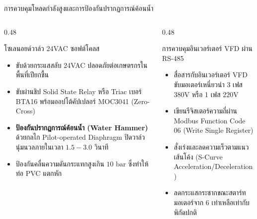 \documentclass[aspectratio=169, 10pt]{beamer}
\begin{document}
\begin{frame}{การควบคุมโหลดกำลังสูงและการป้องกันปรากฏการณ์ค้อนน้ำ}
\begin{columns}[T]
    \begin{column}{0.48\textwidth}
        \begin{mastercard}{โซเลนอยด์วาล์ว 24VAC ซอฟต์โคลส}
            \begin{itemize}
                \item ขับด้วยกระแสสลับ 24VAC ปลอดภัยต่อเกษตรกรในพื้นที่เปียกชื้น
                \item ขับผ่านชิป Solid State Relay หรือ Triac เบอร์ BTA16 พร้อมออปโต้คัปเปลอร์ MOC3041 (Zero-Cross)
                \item \textbf{ป้องกันปรากฏการณ์ค้อนน้ำ (Water Hammer)} ด้วยกลไก Pilot-operated Diaphragm ปิดวาล์วนุ่มนวลภายในเวลา $1.5 - 3.0$ วินาที
                \item ป้องกันคลื่นความดันกระแทกสูงเกิน $10\text{ bar}$ ซึ่งทำให้ท่อ PVC แตกหัก
            \end{itemize}
        \end{mastercard}
    \end{column}
    \begin{column}{0.48\textwidth}
        \begin{goldcard}{การควบคุมอินเวอร์เตอร์ VFD ผ่าน RS-485}
            \begin{itemize}
                \item สื่อสารกับอินเวอร์เตอร์ VFD ขับมอเตอร์เหนี่ยวนำ 3 เฟส $380\text{V}$ หรือ 1 เฟส $220\text{V}$
                \item เขียนรีจิสเตอร์ความถี่ผ่าน Modbus Function Code 06 (Write Single Register)
                \item สั่งเร่งและลดความเร็วตามแนวเส้นโค้ง (S-Curve Acceleration/Deceleration)
                \item ลดกระแสกระชากขณะสตาร์ทมอเตอร์จาก 6 เท่าเหลือเท่ากับพิกัดปกติ
            \end{itemize}
        \end{goldcard}
    \end{column}
\end{columns}
\end{frame}
\end{document}
